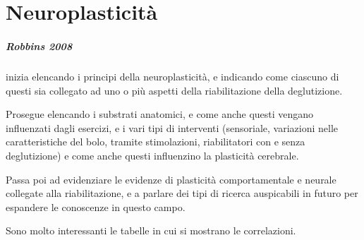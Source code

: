 \chapter{Neuroplasticità}
\paragraph{Robbins 2008} \label{par:rob2008} \cite{Robbins2008} inizia 
elencando i principi della neuroplasticità, e indicando come ciascuno di questi 
sia collegato ad uno o più aspetti della riabilitazione della deglutizione.

Prosegue elencando i substrati anatomici, e come anche questi vengano 
influenzati dagli esercizi, e i vari tipi di interventi (sensoriale, variazioni 
nelle caratteristiche del bolo, tramite stimolazioni, riabilitatori con e senza 
deglutizione) e come anche questi influenzino la plasticità cerebrale.

Passa poi ad evidenziare le evidenze di plasticità comportamentale e neurale 
collegate alla riabilitazione, e a parlare dei tipi di ricerca auspicabili in 
futuro per espandere le conoscenze in questo campo.

Sono molto interessanti le tabelle in cui si mostrano le correlazioni.

